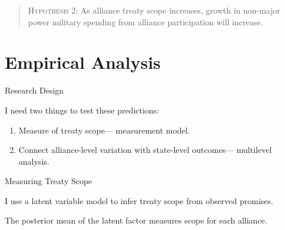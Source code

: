 \documentclass{beamer}
\begin{document}

\begin{frame}[standout]

\begin{quote}
\textsc{Hypothesis 2}: As alliance treaty scope increases, growth in non-major power military spending from alliance participation will increase. 
\end{quote} 


\end{frame}


\section{Empirical Analysis} 


\begin{frame}{Research Design}

I need two things to test these predictions: 

\pause 
\begin{enumerate} 
\item Measure of treaty scope--- measurement model. 
\pause
\item Connect alliance-level variation with state-level outcomes--- multilevel analysis.  
\end{enumerate} 


\end{frame}


\begin{frame}{Measuring Treaty Scope}

I use a latent variable model to infer treaty scope from observed promises. 

\pause 

The posterior mean of the latent factor measures scope for each alliance. 

\end{frame} 

\end{document}
